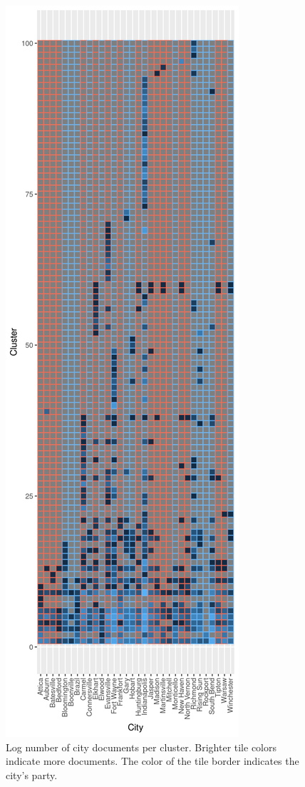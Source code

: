 \documentclass[11pt]{article}
\begin{document}
\begin{figure}[!ht]
	\centering
	\caption{Log number of city documents per cluster. Brighter tile colors indicate more documents. The color of the tile border indicates the city's party.}
	\label{hclustCity100}
	\includegraphics[height = 1.2\textheight]{figures/heatmap_hclust_100.png}
\end{figure}

\newpage

%

\end{document}
